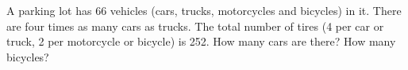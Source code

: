 A parking lot has 66 vehicles (cars, trucks, motorcycles and bicycles)  in it.  There are four times as many cars as trucks.  The total number of tires (4 per car or truck, 2 per motorcycle or bicycle) is 252.  How many cars are there?  How many bicycles?
